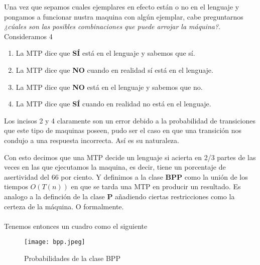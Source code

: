 \documentclass[12pt,letterpaper]{article}
\begin{document}
Una vez que sepamos cuales ejemplares en efecto están o no en el lenguaje y pongamos a funcionar nustra maquina con algún ejemplar, cabe preguntarnos \textit{¿cúales son las posibles combinaciones que puede arrojar la máquina?}. Consideramos 4
\begin{enumerate}
    \item La MTP dice que \textbf{SÍ} está en el lenguaje y sabemos que sí.
    
    \item La MTP dice que \textbf{NO} cuando en realidad sí está en el lenguaje.
    
    \item La MTP dice que \textbf{NO} está en el lenguaje y sabemos que no.
    
    \item La MTP dice que \textbf{SÍ} cuando en realidad no está en el lenguaje.
\end{enumerate}

Los incisos 2 y 4 claramente son un error debido a la probabilidad de transiciones que este tipo de maquinas poseen, pudo ser el caso en que una transición nos condujo a una respuesta incorrecta. Así es su naturaleza.
\newpage

Con esto decimos que una MTP decide un lenguaje si acierta en 2/3 partes de las veces en las que ejecutamos la maquina, es decir, tiene un porcentaje de asertividad del 66 por ciento. Y definimos a la clase \textbf{BPP} como la unión de los tiempos $O(T(n))$ en que se tarda una MTP en producir un resultado. Es analogo a la definción de la clase \textbf{P} añadiendo ciertas restricciones como la certeza de la máquina. O formalmente.\\

\\

Tenemos entonces un cuadro como el siguiente

    \begin{figure}[htb]
    \centering
    \texttt{[image: bpp.jpeg]}
    \caption*{Probabilidades de la clase BPP}
    \end{figure}
\end{document}
